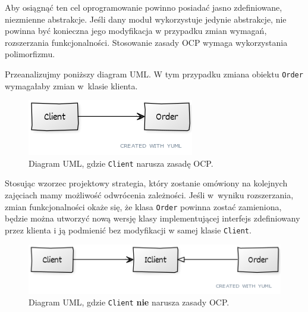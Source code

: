 Aby osiągnąć ten cel oprogramowanie powinno posiadać jasno zdefiniowane, niezmienne abstrakcje. Jeśli dany moduł wykorzystuje jedynie abstrakcje, nie powinna być konieczna jego modyfikacja w przypadku zmian wymagań, rozszerzania funkcjonalności. Stosowanie zasady OCP wymaga wykorzystania polimorfizmu.

Przeanalizujmy poniższy diagram UML. W tym przypadku zmiana obiektu \texttt{Order} wymagałaby zmian w~klasie klienta. 

\begin{figure}[hbt!]
	\centering
	\includegraphics[width=0.6\linewidth]{images/SolidOcpViolationUml}
	\caption{Diagram UML, gdzie \texttt{Client} narusza zasadę OCP.}
	\label{lab1/fig/SolidOcpViolationUml}
\end{figure}

Stosując wzorzec projektowy strategia, który zostanie omówiony na kolejnych zajęciach mamy możliwość odwrócenia zależności. Jeśli w~wyniku rozszerzania, zmian funkcjonalności okaże się, że klasa \texttt{Order} powinna zostać zamieniona, będzie można utworzyć nową wersję klasy implementującej interfejs zdefiniowany przez klienta i ją podmienić bez modyfikacji w samej klasie \texttt{Client}.

\begin{figure}[hbt!]
	\centering
	\includegraphics[width=0.9\linewidth]{images/SolidOcpUml}
	\caption{Diagram UML, gdzie \texttt{Client} \textbf{nie} narusza zasady OCP.}
	\label{lab1/fig/SolidOcpUml}
\end{figure}

